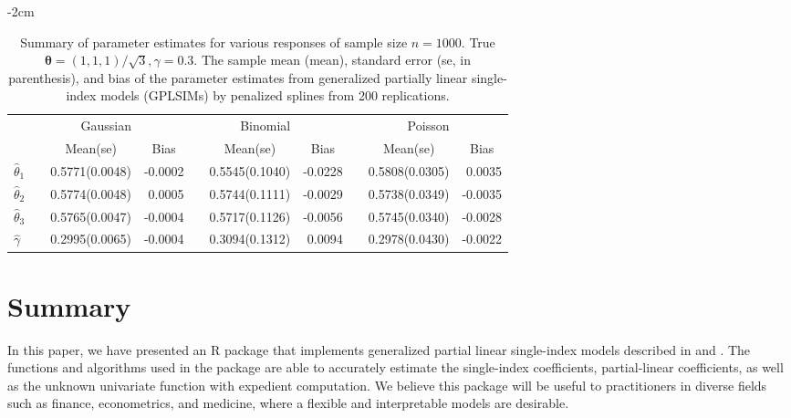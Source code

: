 \begin{table}[!ht]
	\centering
	\addtolength{\leftskip} {-2cm}
	\addtolength{\rightskip}{-2cm}
	
	\begin{tabular}{lllrllrllr}
    \toprule
		&  & \multicolumn{1}{r}{Gaussian} & \multicolumn{1}{c}{}     &  & \multicolumn{1}{r}{Binomial} & \multicolumn{1}{c}{}     &  & \multicolumn{1}{r}{Poisson}              & \multicolumn{1}{l}{}     \\ \cline{3-4} \cline{6-7} \cline{9-10} 
		&  & \multicolumn{1}{c}{Mean(se)} & \multicolumn{1}{c}{Bias} &  & \multicolumn{1}{c}{Mean(se)}         & \multicolumn{1}{c}{Bias} &  & \multicolumn{1}{c}{Mean(se)} & \multicolumn{1}{c}{Bias} \\ \hline
		$\hat{\theta}_1$ &  & 0.5771(0.0048)                      & -0.0002                  &  & 0.5545(0.1040)                       & -0.0228                  &  & 0.5808(0.0305)               & 0.0035                   \\
		$\hat{\theta}_2$ &  & 0.5774(0.0048)                      & 0.0005                   &  & 0.5744(0.1111)                       & -0.0029                  &  & 0.5738(0.0349)               & -0.0035                  \\
		$\hat{\theta}_3$ &  & 0.5765(0.0047)                      & -0.0004                  &  & 0.5717(0.1126)                       & -0.0056                  &  & 0.5745(0.0340)               & -0.0028                  \\
		$\hat{\gamma}$  &  & 0.2995(0.0065)                      & -0.0004                  &  & 0.3094(0.1312)                       & 0.0094                   &  & 0.2978(0.0430)               & -0.0022                 \\
    \toprule
  \end{tabular}
\caption{Summary of parameter estimates for various responses of sample size $n=1000$. True $\boldsymbol{\theta} = (1,1,1)/{\sqrt{3}}, \gamma = 0.3$. The sample mean (mean), standard error (se, in parenthesis), and bias of the parameter estimates from generalized partially linear single-index models (GPLSIMs) by penalized splines from 200 replications.}
\label{tb:sim}
\end{table}


  
\section{Summary}
In this paper, we have presented an R package  that implements generalized partial linear single-index models described in \cite{yu_penalised_2017} and \cite{yu_penalized_2002}. The functions and algorithms used in the package are able to accurately estimate the single-index coefficients, partial-linear coefficients, as well as the unknown univariate function with expedient computation. We believe this package will be useful to practitioners in diverse fields such as finance, econometrics, and medicine, where a flexible and interpretable models are desirable. 

